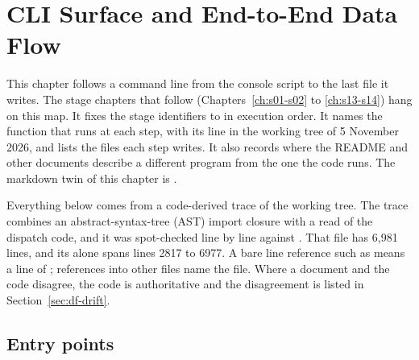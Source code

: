 \chapter{CLI Surface and End-to-End Data Flow}\label{ch:cli-dataflow}

\providecommand{\dftt}[1]{\texttt{#1}}

This chapter follows a command line from the console script to the last file it writes. The stage chapters that follow (Chapters~\ref{ch:s01-s02} to \ref{ch:s13-s14}) hang on this map. It fixes the stage identifiers \leavevmode{} to \leavevmode{} in execution order. It names the function that runs at each step, with its line in the working tree of 5 November 2026, and lists the files each step writes. It also records where the README and other documents describe a different program from the one the code runs. The markdown twin of this chapter is .

Everything below comes from a code-derived trace of the working tree. The trace combines an abstract-syntax-tree (AST) import closure with a read of the dispatch code, and it was spot-checked line by line against . That file has 6,981 lines, and its  alone spans lines 2817 to 6977. A bare line reference such as  means a line of ; references into other files name the file. Where a document and the code disagree, the code is authoritative and the disagreement is listed in Section~\ref{sec:df-drift}.


\section{Entry points}\label{sec:df-entry}

